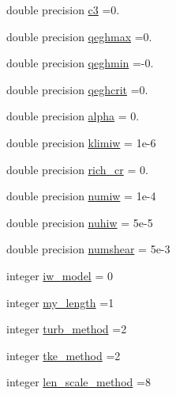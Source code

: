 \begin{DoxyCompactItemize}
\item 
double precision \mbox{\hyperlink{structmodulegotm_1_1t__gotmparameters_ac46b43ef4626dcdc0ce9469a35cf45f6}{c3}} =0.
\item 
double precision \mbox{\hyperlink{structmodulegotm_1_1t__gotmparameters_a85bbefe57dd81bd621cd10d7c4a0047a}{qeghmax}} =0.
\item 
double precision \mbox{\hyperlink{structmodulegotm_1_1t__gotmparameters_a41ce900972a1516bac7c2fba2b856833}{qeghmin}} =-\/0.
\item 
double precision \mbox{\hyperlink{structmodulegotm_1_1t__gotmparameters_aa54271f66af63167ff0163b52c6e5bba}{qeghcrit}} =0.
\item 
double precision \mbox{\hyperlink{structmodulegotm_1_1t__gotmparameters_a4f352cee93234968d7cc5cdbf515bf93}{alpha}} = 0.
\item 
double precision \mbox{\hyperlink{structmodulegotm_1_1t__gotmparameters_a5c3eab69e4f731a60e04eaf47b91e8e5}{klimiw}} = 1e-\/6
\item 
double precision \mbox{\hyperlink{structmodulegotm_1_1t__gotmparameters_a0cea38374bc3898cc9f2de18bcee6de8}{rich\+\_\+cr}} = 0.
\item 
double precision \mbox{\hyperlink{structmodulegotm_1_1t__gotmparameters_ae1f2f360a87220c6a6edabd84ce421d6}{numiw}} = 1e-\/4
\item 
double precision \mbox{\hyperlink{structmodulegotm_1_1t__gotmparameters_a221e82d8af4fb2d94150b86c0550e47c}{nuhiw}} = 5e-\/5
\item 
double precision \mbox{\hyperlink{structmodulegotm_1_1t__gotmparameters_a0163abedad0d4b622b6ee21f33318c75}{numshear}} = 5e-\/3
\item 
integer \mbox{\hyperlink{structmodulegotm_1_1t__gotmparameters_a6a72daa5c5b4d30dda44d8cdcf85137d}{iw\+\_\+model}} = 0
\item 
integer \mbox{\hyperlink{structmodulegotm_1_1t__gotmparameters_ab3c6bd1b6edf24dbb2e4e706a4565224}{my\+\_\+length}} =1
\item 
integer \mbox{\hyperlink{structmodulegotm_1_1t__gotmparameters_a7845a697ee73e092a55ce5f63e8d04c4}{turb\+\_\+method}} =2
\item 
integer \mbox{\hyperlink{structmodulegotm_1_1t__gotmparameters_ac37092e3a5a8ff99281e223c654e9faf}{tke\+\_\+method}} =2
\item 
integer \mbox{\hyperlink{structmodulegotm_1_1t__gotmparameters_a055e50f3f8cb253d487cb8cf283efad2}{len\+\_\+scale\+\_\+method}} =8
\item 

\end{DoxyCompactItemize}
